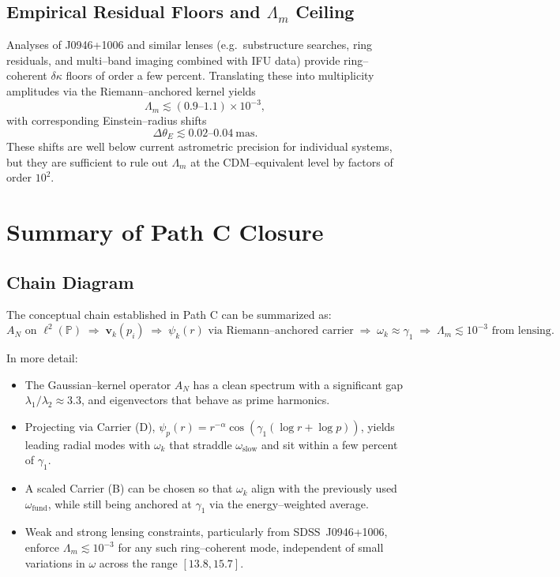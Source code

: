 \documentclass[11pt]{article}
\begin{document}
\subsection{Empirical Residual Floors and $\Lambda_m$ Ceiling}

Analyses of J0946+1006 and similar lenses (e.g.\ substructure searches, ring residuals, and multi--band imaging combined with IFU data) provide ring--coherent $\delta\kappa$ floors of order a few percent. Translating these into multiplicity amplitudes via the Riemann--anchored kernel yields
\begin{equation}
  \Lambda_m \lesssim (0.9\text{--}1.1)\times 10^{-3},
\end{equation}
with corresponding Einstein--radius shifts
\[
\Delta\theta_E \lesssim 0.02\text{--}0.04~\text{mas}.
\]
These shifts are well below current astrometric precision for individual systems, but they are sufficient to rule out $\Lambda_m$ at the CDM--equivalent level by factors of order $10^2$.

\section{Summary of Path C Closure}

\subsection{Chain Diagram}

The conceptual chain established in Path C can be summarized as:
\[
A_N \text{ on } \ell^2(\mathbb{P})
\;\Rightarrow\;
\bm{v}_k(p_i)
\;\Rightarrow\;
\psi_k(r) \text{ via Riemann--anchored carrier}
\;\Rightarrow\;
\omega_k \approx \gamma_1
\;\Rightarrow\;
\Lambda_m \lesssim 10^{-3} \text{ from lensing}.
\]

In more detail:

\begin{itemize}[leftmargin=*]
  \item The Gaussian--kernel operator $A_N$ has a clean spectrum with a significant gap $\lambda_1/\lambda_2 \approx 3.3$, and eigenvectors that behave as prime harmonics.

  \item Projecting via Carrier (D), $\psi_p(r) = r^{-\alpha}\cos(\gamma_1(\log r + \log p))$, yields leading radial modes with $\omega_k$ that straddle $\omega_{\text{slow}}$ and sit within a few percent of $\gamma_1$.

  \item A scaled Carrier (B) can be chosen so that $\omega_k$ align with the previously used $\omega_{\text{fund}}$, while still being anchored at $\gamma_1$ via the energy--weighted average.

  \item Weak and strong lensing constraints, particularly from SDSS~J0946+1006, enforce $\Lambda_m \lesssim 10^{-3}$ for any such ring--coherent mode, independent of small variations in $\omega$ across the range $[13.8,15.7]$.
\end{itemize}
\end{document}
